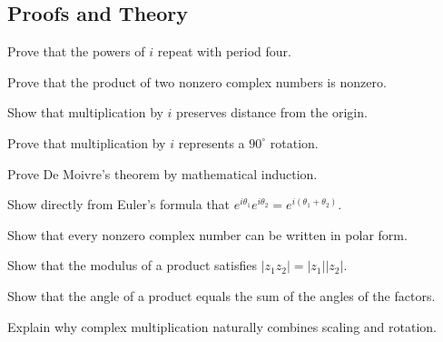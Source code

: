 \subsection*{Proofs and Theory}
\begin{exercise}
Prove that the powers of $i$ repeat with period four.
\end{exercise}
\begin{exercise}
Prove that the product of two nonzero complex numbers is nonzero.
\end{exercise}
\begin{exercise}
Show that multiplication by $i$ preserves distance from the origin.
\end{exercise}
\begin{exercise}
Prove that multiplication by $i$ represents a $90^\circ$ rotation.
\end{exercise}
\begin{exercise}
Prove De Moivre's theorem by mathematical induction.
\end{exercise}
\begin{exercise}
Show directly from Euler's formula that $e^{i\theta_1}e^{i\theta_2} =
e^{i(\theta_1+\theta_2)}$.
\end{exercise}
\begin{exercise}
Show that every nonzero complex number can be written in polar form.
\end{exercise}
\begin{exercise}
Show that the modulus of a product satisfies $|z_1z_2| = |z_1||z_2|$.
\end{exercise}
\begin{exercise}
Show that the angle of a product equals the sum of the angles of the
factors.
\end{exercise}
\begin{exercise}
Explain why complex multiplication naturally combines scaling and
rotation.
\end{exercise}

